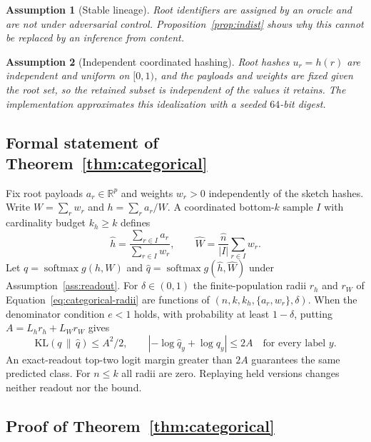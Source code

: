\documentclass{article}
\newtheorem{assumption}{Assumption}
\begin{document}
\begin{assumption}[Stable lineage]
\label{ass:lineage}
Root identifiers are assigned by an oracle and are not under adversarial
control. Proposition~\ref{prop:indist} shows why this cannot be replaced by an
inference from content.
\end{assumption}

\begin{assumption}[Independent coordinated hashing]
\label{ass:hash}
Root hashes $u_r=h(r)$ are independent and uniform on $[0,1)$, and the payloads
and weights are fixed given the root set, so the retained subset is independent
of the values it retains. The implementation approximates this idealization
with a seeded $64$-bit digest.
\end{assumption}

\subsection{Formal statement of Theorem~\ref{thm:categorical}}

Fix root payloads $a_r\in\mathbb R^p$ and weights $w_r>0$ independently of the
sketch hashes. Write $W=\sum_r w_r$ and $h=\sum_r a_r/W$. A coordinated
bottom-$k$ sample $I$ with cardinality budget $k_h\ge k$ defines
\[
\hat h=\frac{\sum_{r\in I}a_r}{\sum_{r\in I}w_r},\qquad
\hat W=\frac{\hat n}{|I|}\sum_{r\in I}w_r.
\]
Let $q=\operatorname{softmax}g(h,W)$ and
$\hat q=\operatorname{softmax}g(\hat h,\hat W)$ under
Assumption~\ref{ass:readout}. For $\delta\in(0,1)$ the finite-population radii
$r_h$ and $r_W$ of Equation~\ref{eq:categorical-radii} are functions of
$(n,k,k_h,\{a_r,w_r\},\delta)$. When the denominator condition $e<1$ holds, with
probability at least $1-\delta$, putting $A=L_h r_h+L_W r_W$ gives
\begin{equation}
\mathrm{KL}(q\,\|\,\hat q)\le A^2/2,\qquad
|{-\log\hat q_y}+\log q_y|\le2A\quad\text{for every label }y.
\label{eq:categorical-memory}
\end{equation}
An exact-readout top-two logit margin greater than $2A$ guarantees the same
predicted class. For $n\le k$ all radii are zero. Replaying held versions
changes neither readout nor the bound.

\subsection{Proof of Theorem~\ref{thm:categorical}}
\end{document}
